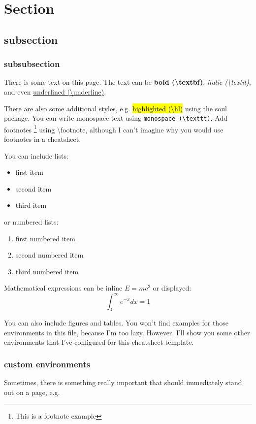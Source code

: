 
\section{Section}
\subsection{subsection}
\subsubsection{subsubsection}

There is some text on this page. The text can be \textbf{bold (\textbackslash textbf)}, \textit{italic (\textbackslash textit)}, and even \underline{underlined (\textbackslash underline)}.

There are also some additional styles, e.g. \hl{highlighted (\textbackslash hl)} using the soul package. You can write monospace text using \texttt{monospace (\textbackslash texttt)}. Add footnotes \footnote{This is a footnote example} using \textbackslash footnote, although I can't imagine why you would use footnotes in a cheatsheet.

You can include lists:
\begin{itemize}
    \item first item
    \item second item
    \item third item
\end{itemize}

or numbered lists:
\begin{enumerate}
    \item first numbered item
    \item second numbered item
    \item third numbered item
\end{enumerate}

Mathematical expressions can be inline $E=mc^2$ or displayed:
$$
\int_0^\infty e^{-x} dx = 1
$$

You can also include figures and tables. You won't find examples for those environments in this file, because I'm too lazy. However, I'll show you some other environments that I've configured for this cheatsheet template.

\subsubsection{custom environments}
Sometimes, there is something really important that should immediately stand out on a page, e.g.

